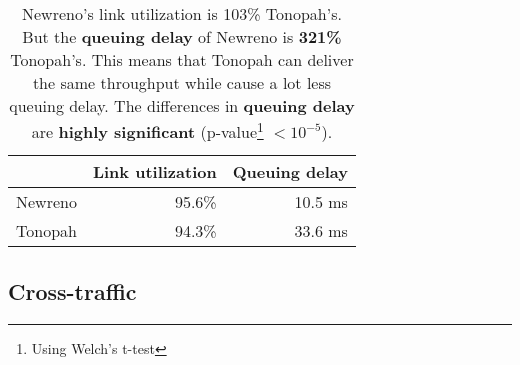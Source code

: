 \documentclass[conference]{IEEEtran}
\begin{document}
\begin{table}
\begin{minipage}{\columnwidth}
\centering
\begin{tabular}{| r | r | r |}
\hline
& Link utilization & Queuing delay \\ \hline
Newreno & 95.6\% & 10.5 ms \\ \hline
Tonopah & 94.3\% & 33.6 ms \\ \hline
\end{tabular}
\caption{Newreno's link utilization is 103\% Tonopah's. But the \textbf{queuing delay} of Newreno is \textbf{321\%} Tonopah's. This means that Tonopah can deliver the same throughput while cause a lot less queuing delay. The differences in \textbf{queuing delay} are \textbf{highly significant} (p-value\protect\footnote{Using Welch's t-test} $< 10^{-5}$).}
\label{table:throughput_and_delay}
\end{minipage}
\end{table}    

\subsection{Cross-traffic}
\end{document}
